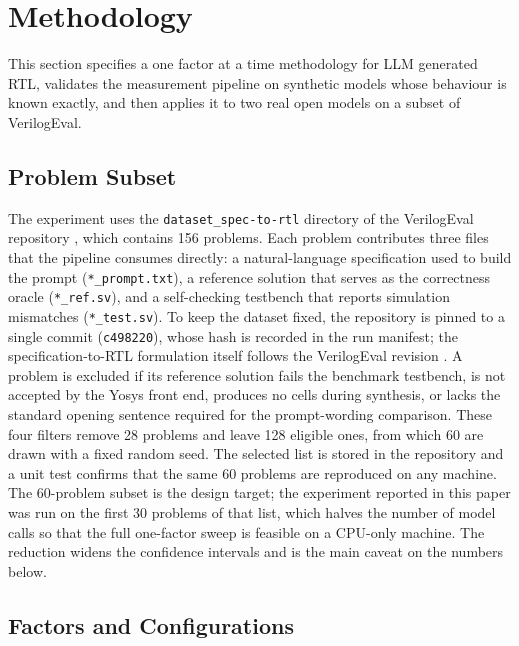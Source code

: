 \documentclass[conference]{IEEEtran}
\begin{document}
\section{Methodology}\label{sec_method}

This section specifies a one factor at a time methodology for LLM generated RTL, validates the measurement pipeline on synthetic models whose behaviour is known exactly, and then applies it to two real open models on a subset of VerilogEval.

\subsection{Problem Subset}\label{sec_m_subset}

\noindent The experiment uses the \texttt{dataset\_spec-to-rtl} directory of the VerilogEval repository \cite{P12_Liu2023,P15_Pinckney2025}, which contains 156 problems. Each problem contributes three files that the pipeline consumes directly: a natural-language specification used to build the prompt (\texttt{*\_prompt.txt}), a reference solution that serves as the correctness oracle (\texttt{*\_ref.sv}), and a self-checking testbench that reports simulation mismatches (\texttt{*\_test.sv}). To keep the dataset fixed, the repository is pinned to a single commit (\texttt{c498220}), whose hash is recorded in the run manifest; the specification-to-RTL formulation itself follows the VerilogEval revision \cite{P15_Pinckney2025}. A problem is excluded if its reference solution fails the benchmark testbench, is not accepted by the Yosys front end, produces no cells during synthesis, or lacks the standard opening sentence required for the prompt-wording comparison. These four filters remove 28 problems and leave 128 eligible ones, from which 60 are drawn with a fixed random seed. The selected list is stored in the repository and a unit test confirms that the same 60 problems are reproduced on any machine. The 60-problem subset is the design target; the experiment reported in this paper was run on the first 30 problems of that list, which halves the number of model calls so that the full one-factor sweep is feasible on a CPU-only machine. The reduction widens the confidence intervals and is the main caveat on the numbers below.

\subsection{Factors and Configurations}\label{sec_m_factors}
\end{document}

